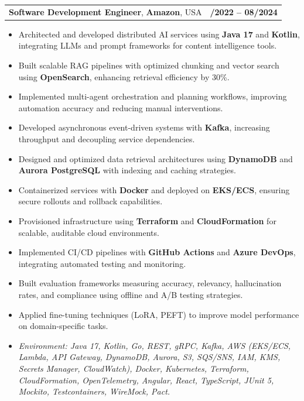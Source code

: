 \documentclass[letterpaper,11pt]{article}
\makeatletter
\newcommand{\resumeItem}[1]{
  \item\footnotesize{
    {#1 \vspace{-2pt}}
  }
}
\newcommand{\resumeSubheading}[4]{
  \vspace{-2pt}\item
    \begin{tabular*}{1.0\textwidth}[t]{l@{\extracolsep{\fill}}r}
      \textbf{\fontsize{10pt}{14pt}\selectfont #3}, \textbf{\fontsize{10pt}{14pt}\selectfont #1}, \fontsize{10pt}{14pt}\selectfont #4 & \textbf{\fontsize{10pt}{14pt}\selectfont #2} \\
    \end{tabular*}\vspace{-7pt}
}
\newcommand{\resumeItemListStart}{\begin{itemize}[leftmargin=*]}
\newcommand{\resumeItemListEnd}{\end{itemize}\vspace{-5pt}}
\makeatother
\begin{document}
\resumeSubheading
{Amazon}{10/2022 -- 08/2024}
{Software Development Engineer}{USA}
\resumeItemListStart
  \resumeItem{Architected and developed distributed AI services using \textbf{Java 17} and \textbf{Kotlin}, integrating LLMs and prompt frameworks for content intelligence tools.}
  \resumeItem{Built scalable RAG pipelines with optimized chunking and vector search using \textbf{OpenSearch}, enhancing retrieval efficiency by 30\%.}
  \resumeItem{Implemented multi-agent orchestration and planning workflows, improving automation accuracy and reducing manual interventions.}
  \resumeItem{Developed asynchronous event-driven systems with \textbf{Kafka}, increasing throughput and decoupling service dependencies.}
  \resumeItem{Designed and optimized data retrieval architectures using \textbf{DynamoDB} and \textbf{Aurora PostgreSQL} with indexing and caching strategies.}
  \resumeItem{Containerized services with \textbf{Docker} and deployed on \textbf{EKS/ECS}, ensuring secure rollouts and rollback capabilities.}
  \resumeItem{Provisioned infrastructure using \textbf{Terraform} and \textbf{CloudFormation} for scalable, auditable cloud environments.}
  \resumeItem{Implemented CI/CD pipelines with \textbf{GitHub Actions} and \textbf{Azure DevOps}, integrating automated testing and monitoring.}
  \resumeItem{Built evaluation frameworks measuring accuracy, relevancy, hallucination rates, and compliance using offline and A/B testing strategies.}
  \resumeItem{Applied fine-tuning techniques (LoRA, PEFT) to improve model performance on domain-specific tasks.}
  \resumeItem{\textit{Environment: Java 17, Kotlin, Go, REST, gRPC, Kafka, AWS (EKS/ECS, Lambda, API Gateway, DynamoDB, Aurora, S3, SQS/SNS, IAM, KMS, Secrets Manager, CloudWatch), Docker, Kubernetes, Terraform, CloudFormation, OpenTelemetry, Angular, React, TypeScript, JUnit 5, Mockito, Testcontainers, WireMock, Pact.}}
\resumeItemListEnd
\end{document}
